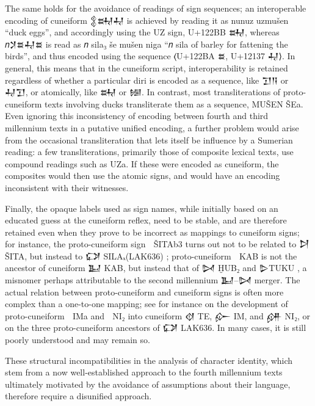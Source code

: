 The same holds for the avoidance of readings of sign sequences; an
interoperable encoding of cuneiform 𒉭𒊻𒄷 is achieved by reading it as
nunuz uzmušen “duck eggs”, and accordingly using the UZ sign, U+122BB
𒊻, whereas 𝑛𒋡𒊺𒄷𒊺 is read as 𝑛 sila₃ še mušen niga “𝑛 sila of barley
for fattening the birds”, and thus encoded using the sequence ⟨U+122BA
𒊺, U+12137 𒄷⟩. In general, this means that in the cuneiform script,
interoperability is retained regardless of whether a particular diri
is encoded as a sequence, like 𒋛𒀀 or 𒄷𒋛, or atomically, like 𒊻 or
𒎏. In contrast, most transliterations of proto-cuneiform texts
involving ducks transliterate them as a sequence, MUŠEN ŠEa. Even
ignoring this inconsistency of encoding between fourth and third
millennium texts in a putative unified encoding, a further problem
would arise from the occasional transliteration that lets itself be
influence by a Sumerian reading: a few transliterations, primarily
those of composite lexical texts, use compound readings such as
UZa. If these were encoded as cuneiform, the composites would then use
the atomic signs, and would have an encoding inconsistent with their
witnesses.

Finally, the opaque labels used as sign names, while initially based
on an educated guess at the cuneiform reflex, need to be stable, and
are therefore retained even when they prove to be incorrect as
mappings to cuneiform signs; for instance, the proto-cuneiform sign 𒨾
ŠITAb3 turns out not to be related to 𒋖 ŠITA, but instead to 𒔌
SILAₓ(LAK636) \cite[220]{Wagensonner2016}; proto-cuneiform 𒡰 KAB is
not the ancestor of cuneiform 𒆏 KAB, but instead that of 𒄸 ḪUB₂ and
𒌇TUKU \cite[274]{Wagensonner2016}, a misnomer perhaps attributable to
the second millennium 𒆏–𒄸 merger. The actual relation between
proto-cuneiform and cuneiform signs is often more complex than a
one-to-one mapping; see for instance \cite[217]{Wagensonner2016} on
the development of proto-cuneiform 𒡠 IMa and 𒡡 NI₂ into cuneiform 𒋼
TE, 𒅎 IM, and 𒉎 NI₂, or \cite[220]{Wagensonner2016} on the three
proto-cuneiform ancestors of 𒔌 LAK636. In many cases, it is still
poorly understood and may remain so.

These structural incompatibilities in the analysis of character
identity, which stem from a now well-established approach to the
fourth millennium texts ultimately motivated by the avoidance of
assumptions about their language, therefore require a disunified
approach.
